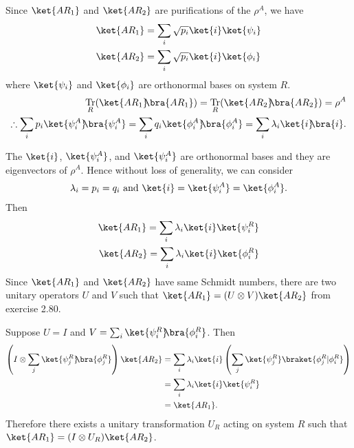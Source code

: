 \documentclass[10pt]{book}
\DeclareMathOperator{\Tr}{Tr}
\newcommand{\kb}[1]{\ket{#1}\hspace{-1mm} \bra{#1}} %
\newcommand{\kbt}[2]{\ket{#1}\hspace{-1mm} \bra{#2}} %
\begin{document}
	Since $\ket{AR_1}$ and $\ket{AR_2}$ are purifications of the $\rho^A$, we have
	 \begin{equation}
		\begin{aligned}
		     \ket{AR_1} &= \sum_i \sqrt{p_i} \ket{i} \ket{\psi_i}\\
		     \ket{AR_2} &= \sum_i \sqrt{p_i} \ket{i} \ket{\phi_i}
		 \end{aligned}
		\end{equation}
	 where $\ket{\psi_i}$ and $\ket{\phi_i}$ are orthonormal bases on system $R$.
	\begin{equation}
\begin{aligned}
		\Tr_R (\kb{AR_1}) = \Tr_R (\kb{AR_2}) = \rho^A\\
		\therefore \sum_i p_i \kb{\psi_i^A} = \sum_i q_i \kb{\phi_i^A} = \sum_i \lambda_i \kb{i}.
	\end{aligned}
\end{equation}
	
	The $\ket{i}$, $\ket{\psi_i^A}$, and $\ket{\psi_i^A}$ are orthonormal bases and they are eigenvectors of $\rho^A$.
	Hence without loss of generality, we can consider
	\begin{equation}
\begin{aligned}
		\lambda_i = p_i = q_i \text{ and } \ket{i} = \ket{\psi_i^A} = \ket{\phi_i^A}.
	\end{aligned}
\end{equation}
	Then
	\begin{equation}
\begin{aligned}
		\ket{AR_1} = \sum_i \lambda_i \ket{i} \ket{\psi_i^R}\\
		\ket{AR_2} = \sum_i \lambda_i \ket{i} \ket{\phi_i^R}
	\end{aligned}
\end{equation}
	Since $\ket{AR_1}$ and $\ket{AR_2}$ have same Schmidt numbers, there are two unitary operators $U$ and $V$ such that
	$\ket{AR_1} = (U \otimes V) \ket{AR_2}$ from exercise 2.80.
	
	Suppose $U = I$ and $V = \sum_i \kbt{\psi_i^R}{\phi_i^R}$.
	Then
	\begin{equation}
\begin{aligned}
		\left(I \otimes \sum_j \kbt{\psi_j^R}{\phi_j^R} \right) \ket{AR_2} &= \sum_i \lambda_i \ket{i} \left( \sum_j \ket{\psi_j^R} \braket{\phi_j^R | \phi_i^R} \right)\\
		&= \sum_i \lambda_i \ket{i} \ket{\psi_i^R}\\
		&= \ket{AR_1}.
	\end{aligned}
\end{equation}
	Therefore there exists a unitary transformation $U_R$ acting on system $R$ such that $\ket{AR_1} = (I \otimes U_R) \ket{AR_2}$.
	
\end{document}
